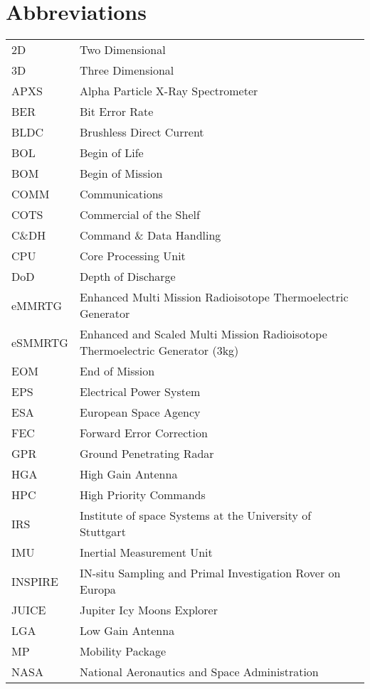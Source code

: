 \chapter*{Abbreviations}


\begin{longtable}[l]{ll}

2D		& Two Dimensional \\
3D		& Three Dimensional \\
APXS	& Alpha Particle X-Ray Spectrometer \\
BER		& Bit Error Rate \\
BLDC	& Brushless Direct Current	\\
BOL     & Begin of Life \\
BOM     & Begin of Mission \\
COMM    & Communications \\
COTS	& Commercial of the Shelf \\
C\&DH	& Command \& Data Handling \\
CPU		& Core Processing Unit \\
DoD     & Depth of Discharge \\
eMMRTG  & Enhanced Multi Mission Radioisotope Thermoelectric Generator \\
eSMMRTG & Enhanced and Scaled Multi Mission Radioisotope Thermoelectric Generator (3kg) \\
EOM     & End of Mission \\
EPS     & Electrical Power System \\
ESA		& European Space Agency	\\
FEC		& Forward Error Correction \\
GPR		& Ground Penetrating Radar \\
HGA	    & High Gain Antenna \\
HPC     & High Priority Commands \\
IRS     & Institute of space Systems at the University of Stuttgart \\
IMU     & Inertial Measurement Unit \\
INSPIRE & IN-situ Sampling and Primal Investigation Rover on Europa \\
JUICE 	& Jupiter Icy Moons Explorer \\
LGA		& Low Gain Antenna \\
MP		& Mobility Package \\
NASA    &   National Aeronautics and Space Administration \\		

\end{longtable}
